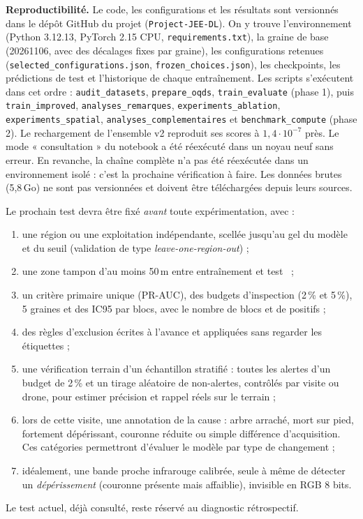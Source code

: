 \documentclass[10pt,a4paper,twocolumn]{article}
\makeatletter
\renewcommand\section{\@startsection{section}{1}{\z@}{-1.6ex plus -.4ex}{0.7ex}{\normalfont\large\bfseries\color{olive}}}
\makeatother
\begin{document}
\textbf{Reproductibilité.} Le code, les configurations et les résultats sont versionnés dans le dépôt GitHub du projet
(\texttt{Project-JEE-DL}). On y trouve l'environnement (Python 3.12.13, PyTorch 2.15 CPU, \texttt{requirements.txt}),
la graine de base (20261106, avec des décalages fixes par graine), les configurations retenues
(\texttt{selected\_configurations.json}, \texttt{frozen\_choices.json}), les checkpoints, les prédictions de test et
l'historique de chaque entraînement. Les scripts s'exécutent dans cet ordre : \texttt{audit\_datasets}, \texttt{prepare\_oqds},
\texttt{train\_evaluate} (phase 1), puis \texttt{train\_improved}, \texttt{analyses\_remarques}, \texttt{experiments\_ablation},
\texttt{experiments\_spatial}, \texttt{analyses\_complementaires} et \texttt{benchmark\_compute} (phase 2). Le rechargement de
l'ensemble v2 reproduit ses scores à $1{,}4\cdot10^{-7}$ près. Le mode « consultation » du notebook a été réexécuté dans un
noyau neuf sans erreur. En revanche, la chaîne complète n'a pas été réexécutée dans un environnement isolé : c'est la prochaine
vérification à faire. Les données brutes (5,8\,Go) ne sont pas versionnées et doivent être téléchargées depuis leurs sources.

\section{Protocole de validation futur}
\label{sec:future}
Le prochain test devra être fixé \emph{avant} toute expérimentation, avec :
\begin{enumerate}
\item une région ou une exploitation indépendante, scellée jusqu'au gel du modèle et du seuil (validation de type
\emph{leave-one-region-out}) ;
\item une zone tampon d'au moins 50\,m entre entraînement et test~\cite{valavi} ;
\item un critère primaire unique (PR-AUC), des budgets d'inspection (2\,\% et 5\,\%), 5 graines et des IC95 par blocs, avec
le nombre de blocs et de positifs ;
\item des règles d'exclusion écrites à l'avance et appliquées sans regarder les étiquettes ;
\item une vérification terrain d'un échantillon stratifié : toutes les alertes d'un budget de 2\,\% et un tirage aléatoire de
non-alertes, contrôlés par visite ou drone, pour estimer précision et rappel réels sur le terrain ;
\item lors de cette visite, une annotation de la cause : arbre arraché, mort sur pied, fortement dépérissant, couronne réduite
ou simple différence d'acquisition. Ces catégories permettront d'évaluer le modèle par type de changement ;
\item idéalement, une bande proche infrarouge calibrée, seule à même de détecter un \emph{dépérissement} (couronne présente mais
affaiblie), invisible en RGB 8 bits.
\end{enumerate}
Le test actuel, déjà consulté, reste réservé au diagnostic rétrospectif.
\end{document}
